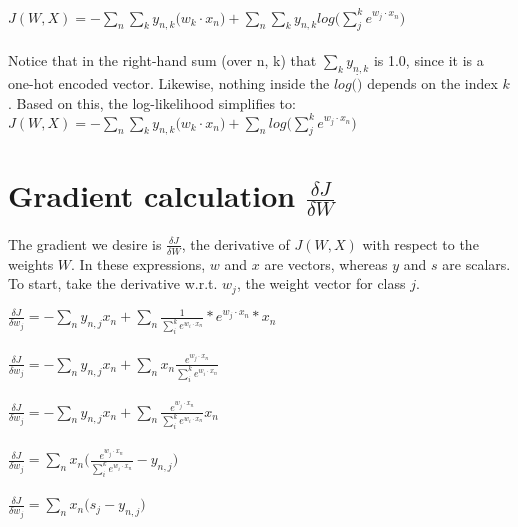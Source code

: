 \documentclass{article}
\begin{document}
$ \boxed{ J(W,X) = - \sum_{n} \sum_{k} y_{n,k}\big(w_{k} \cdot x_{n}\big) + \sum_{n} \sum_{k} y_{n,k} log\big(\sum_{j}^{k} e^{w_{j} \cdot x_{n}}\big) }$ \\ \\

Notice that in the right-hand sum (over n, k) that $\sum_{k} y_{n,k}$ is 1.0, since it is a one-hot encoded vector. Likewise, nothing inside the $log(\dot)$ depends on the index $k$. Based on this, the log-likelihood simplifies to: \\

$ \boxed{ J(W,X) = - \sum_{n} \sum_{k} y_{n,k}\big(w_{k} \cdot x_{n}\big) + \sum_{n} log\big(\sum_{j}^{k} e^{w_{j} \cdot x_{n}}\big) }$ \\


\section{Gradient calculation $\frac{\delta J}{\delta W}$}

The gradient we desire is $\frac{\delta J}{\delta W}$, the derivative of $J(W,X)$ with respect to the weights $W$.
In these expressions, $w$ and $x$ are vectors, whereas $y$ and $s$ are scalars. To start, take the derivative w.r.t. $w_j$, the weight vector for class $j$.

$\frac{\delta J}{\delta w_{j}} = - \sum_{n} y_{n,j} x_{n} + \sum_{n} \frac{1}{\sum_{i}^{k} e^{w_{i} \cdot x_{n}}} * e^{w_j \cdot x_{n}} * x_{n}  $ \\ \\

$\frac{\delta J}{\delta w_{j}} = - \sum_{n} y_{n,j} x_{n} + \sum_{n} x_{n} \frac{e^{w_j \cdot x_{n}}} {\sum_{i}^{k} e^{w_{i} \cdot x_{n}}}  $ \\ \\

$\frac{\delta J}{\delta w_{j}} = - \sum_{n} y_{n,j} x_{n} + \sum_{n} \frac{e^{w_j \cdot x_{n}}} {\sum_{i}^{k} e^{w_{i} \cdot x_{n}}} x_{n} $ \\ \\


$\frac{\delta J}{\delta w_{j}} = \sum_{n} x_{n} \big(\frac{e^{w_j \cdot x_{n}}} {\sum_{i}^{k} e^{w_{i} \cdot x_{n}}} - y_{n,j}\big) $ \\ \\

$\frac{\delta J}{\delta w_{j}} = \sum_{n} x_{n} \big(s_{j} - y_{n,j}\big) $ \\ \\
\end{document}

